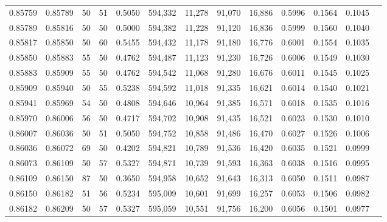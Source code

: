 \begin{tabular}{rrrrrrrrrrrrr}
0.85759 & 0.85789 &    50 &  51 &                                     0.5050 & 594,332 &  11,278 &  91,070 &  16,886 & 0.5996 & 0.1564 & 0.1045 \\
0.85789 & 0.85816 &    50 &  50 &                                     0.5000 & 594,382 &  11,228 &  91,120 &  16,836 & 0.5999 & 0.1560 & 0.1040 \\
0.85817 & 0.85850 &    50 &  60 &                                     0.5455 & 594,432 &  11,178 &  91,180 &  16,776 & 0.6001 & 0.1554 & 0.1035 \\
0.85850 & 0.85883 &    55 &  50 &                                     0.4762 & 594,487 &  11,123 &  91,230 &  16,726 & 0.6006 & 0.1549 & 0.1030 \\
0.85883 & 0.85909 &    55 &  50 &                                     0.4762 & 594,542 &  11,068 &  91,280 &  16,676 & 0.6011 & 0.1545 & 0.1025 \\
0.85909 & 0.85940 &    50 &  55 &                                     0.5238 & 594,592 &  11,018 &  91,335 &  16,621 & 0.6014 & 0.1540 & 0.1021 \\
0.85941 & 0.85969 &    54 &  50 &                                     0.4808 & 594,646 &  10,964 &  91,385 &  16,571 & 0.6018 & 0.1535 & 0.1016 \\
0.85970 & 0.86006 &    56 &  50 &                                     0.4717 & 594,702 &  10,908 &  91,435 &  16,521 & 0.6023 & 0.1530 & 0.1010 \\
0.86007 & 0.86036 &    50 &  51 &                                     0.5050 & 594,752 &  10,858 &  91,486 &  16,470 & 0.6027 & 0.1526 & 0.1006 \\
0.86036 & 0.86072 &    69 &  50 &                                     0.4202 & 594,821 &  10,789 &  91,536 &  16,420 & 0.6035 & 0.1521 & 0.0999 \\
0.86073 & 0.86109 &    50 &  57 &                                     0.5327 & 594,871 &  10,739 &  91,593 &  16,363 & 0.6038 & 0.1516 & 0.0995 \\
0.86109 & 0.86150 &    87 &  50 &                                     0.3650 & 594,958 &  10,652 &  91,643 &  16,313 & 0.6050 & 0.1511 & 0.0987 \\
0.86150 & 0.86182 &    51 &  56 &                                     0.5234 & 595,009 &  10,601 &  91,699 &  16,257 & 0.6053 & 0.1506 & 0.0982 \\
0.86182 & 0.86209 &    50 &  57 &                                     0.5327 & 595,059 &  10,551 &  91,756 &  16,200 & 0.6056 & 0.1501 & 0.0977 \\

\end{tabular}

